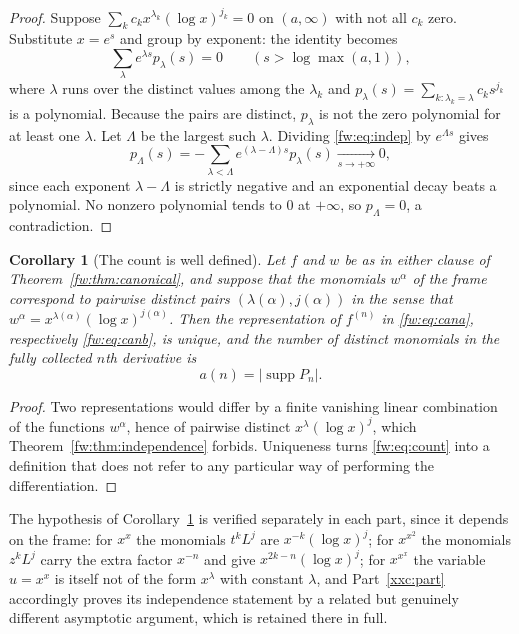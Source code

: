 \documentclass[11pt,a4paper]{article}
\numberwithin{equation}{section}
\newtheorem{corollary}[theorem]{Corollary}
\theoremstyle{definition}
\theoremstyle{remark}
\theoremstyle{plain}
\DeclareMathOperator{\supp}{supp}
\begin{document}
\begin{proof}
Suppose $\sum_k c_kx^{\lambda_k}(\log x)^{j_k}=0$ on $(a,\infty)$ with not all
$c_k$ zero.  Substitute $x=e^s$ and group by exponent: the identity becomes
\begin{equation}\label{fw:eq:indep}
 \sum_{\lambda}e^{\lambda s}p_\lambda(s)=0\qquad(s>\log\max(a,1)),
\end{equation}
where $\lambda$ runs over the distinct values among the $\lambda_k$ and
$p_\lambda(s)=\sum_{k:\lambda_k=\lambda}c_ks^{j_k}$ is a polynomial.  Because the
pairs are distinct, $p_\lambda$ is not the zero polynomial for at least one
$\lambda$.  Let $\Lambda$ be the largest such $\lambda$.  Dividing
\eqref{fw:eq:indep} by $e^{\Lambda s}$ gives
\[
 p_\Lambda(s)=-\sum_{\lambda<\Lambda}e^{(\lambda-\Lambda)s}p_\lambda(s)
 \xrightarrow[s\to+\infty]{}0,
\]
since each exponent $\lambda-\Lambda$ is strictly negative and an exponential
decay beats a polynomial.  No nonzero polynomial tends to $0$ at $+\infty$, so
$p_\Lambda=0$, a contradiction.
\end{proof}

\begin{corollary}[The count is well defined]\label{fw:cor:welldefined}
Let $f$ and $w$ be as in either clause of Theorem~\textup{\ref{fw:thm:canonical}},
and suppose that the monomials $w^\alpha$ of the frame correspond to pairwise
distinct pairs $(\lambda(\alpha),j(\alpha))$ in the sense that
$w^\alpha=x^{\lambda(\alpha)}(\log x)^{j(\alpha)}$.  Then the representation
of $f^{(n)}$ in \eqref{fw:eq:cana}, respectively \eqref{fw:eq:canb}, is unique,
and the number of distinct monomials in the fully collected $n$th derivative is
\begin{equation}\label{fw:eq:count}
 a(n)=|\supp P_n| .
\end{equation}
\end{corollary}

\begin{proof}
Two representations would differ by a finite vanishing linear combination of the
functions $w^\alpha$, hence of pairwise distinct $x^{\lambda}(\log x)^{j}$,
which Theorem~\ref{fw:thm:independence} forbids.  Uniqueness turns
\eqref{fw:eq:count} into a definition that does not refer to any particular way
of performing the differentiation.
\end{proof}

The hypothesis of Corollary~\ref{fw:cor:welldefined} is verified separately in
each part, since it depends on the frame: for $x^x$ the monomials $t^kL^j$ are
$x^{-k}(\log x)^j$; for $x^{x^2}$ the monomials $z^kL^j$ carry the extra factor
$x^{-n}$ and give $x^{2k-n}(\log x)^j$; for $x^{x^x}$ the variable $u=x^x$ is
itself not of the form $x^\lambda$ with constant $\lambda$, and
Part~\ref{xxc:part} accordingly proves its independence statement by a related
but genuinely different asymptotic argument, which is retained there in full.
\end{document}
